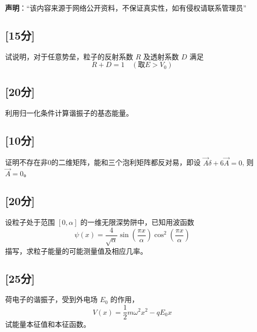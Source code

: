 
\textbf{声明}：“该内容来源于网络公开资料，不保证真实性，如有侵权请联系管理员”

\subsection{[15分]}
试说明，对于任意势垒，粒子的反射系数 $R$ 及透射系数 $D$ 满足
\[    R + D = 1 \quad (\text{取} E > V_0) ~ \]
\subsection{[20分]}
利用归一化条件计算谐振子的基态能量。
\subsection{[10分]}
证明不存在非0的二维矩阵，能和三个泡利矩阵都反对易，即设 $\vec A \delta + 6\vec A = 0$, 则 $\vec{A} = 0$。
\subsection{[20分]}
设粒子处于范围 $[0, \alpha]$ 的一维无限深势阱中，已知用波函数
    \[    \psi(x) = \frac{4}{\sqrt{\alpha}} \sin\left(\frac{\pi x}{\alpha}\right) \cos^2\left(\frac{\pi x}{\alpha}\right) ~ \]
    描写，求粒子能量的可能测量值及相应几率。
\subsection{[25分]}
荷电子的谐振子，受到外电场 $E_0$ 的作用，
    \[    V(x) = \frac{1}{2} m \omega^2 x^2 - q E_0 x  ~\]
 试能量本征值和本征函数。